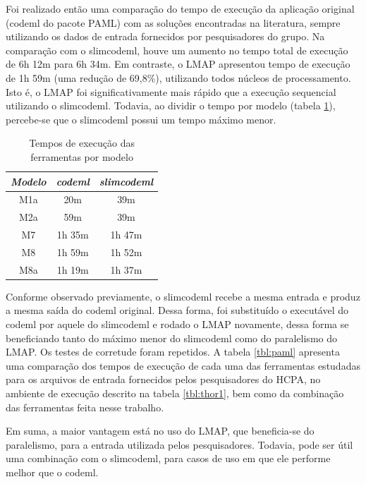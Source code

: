 \documentclass[cic,tc]{iiufrgs}
\begin{document}
Foi realizado então uma comparação do tempo de execução da aplicação original
(codeml do pacote PAML) com as soluções encontradas na literatura, sempre
utilizando os dados de entrada fornecidos por pesquisadores do grupo. Na
comparação com o slimcodeml, houve um aumento no tempo total de execução de 6h
12m para 6h 34m. Em contraste, o LMAP apresentou tempo de execução de 1h 59m
(uma redução de 69,8\%), utilizando todos núcleos de processamento. Isto é, o
LMAP foi significativamente mais rápido que a execução sequencial utilizando o
slimcodeml. Todavia, ao dividir o tempo por modelo (tabela
\ref{tbl:pamstages}), percebe-se que o slimcodeml possui um tempo máximo menor.

\begin{table}[h]
    \caption{Tempos de execução das ferramentas por modelo}
    \centering
        \begin{tabular}{c|c|c}
          \hline
          \textit{Modelo}  & \textit{codeml} & \textit{slimcodeml} \\
          \hline
          \hline
          M1a & 20m    & 39m   \\
          M2a & 59m    & 39m    \\
          M7  & 1h 35m & 1h 47m \\
          M8  & 1h 59m & 1h 52m \\
          M8a & 1h 19m & 1h 37m \\
          \hline
        \end{tabular}
    \label{tbl:pamstages}
\end{table}

Conforme observado previamente, o slimcodeml recebe a mesma entrada e produz a
mesma saída do codeml original. Dessa forma, foi substituído o executável do
codeml por aquele do slimcodeml e rodado o LMAP novamente, dessa forma se
beneficiando tanto do máximo menor do slimcodeml como do paralelismo do LMAP.
Os testes de corretude foram repetidos. A tabela \ref{tbl:paml} apresenta uma
comparação dos tempos de execução de cada uma das ferramentas estudadas para os
arquivos de entrada fornecidos pelos pesquisadores do HCPA, no ambiente de
execução descrito na tabela \ref{tbl:thor1}, bem como da combinação das
ferramentas feita nesse trabalho. 

Em suma, a maior vantagem está no uso do LMAP, que beneficia-se do paralelismo,
para a entrada utilizada pelos pesquisadores. Todavia, pode ser útil uma
combinação com o slimcodeml, para casos de uso em que ele performe melhor que o
codeml. 
\end{document}
